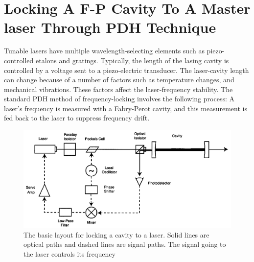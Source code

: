 \documentclass[12pt]{report}
\begin{document}
\chapter{Locking A F-P Cavity To A Master laser Through PDH Technique}
Tunable lasers have multiple wavelength-selecting elements such as piezo-controlled etalons and gratings. Typically, the length of the lasing cavity is controlled by a voltage sent to a piezo-electric transducer. The laser-cavity length can change because of a number of factors such as temperature changes, and mechanical vibrations. These factors affect the laser-frequency stability. The standard PDH method of frequency-locking involves the following process: A laser's frequency is measured with a Fabry-Perot cavity, and this measurement is fed back to the laser to suppress frequency drift\cite{PDH1983}\cite{PDHintro}.
\par
\begin{figure}[H]
    \centering
    \includegraphics[width=.8\textwidth]{PDHlayout.png}
    \caption{The basic layout for locking a cavity to a laser. Solid lines are optical paths and dashed lines are signal paths. The signal going to the laser controls its frequency \cite{PDHintro}}
    \label{fig:PDHlayout}
\end{figure}
\end{document}
